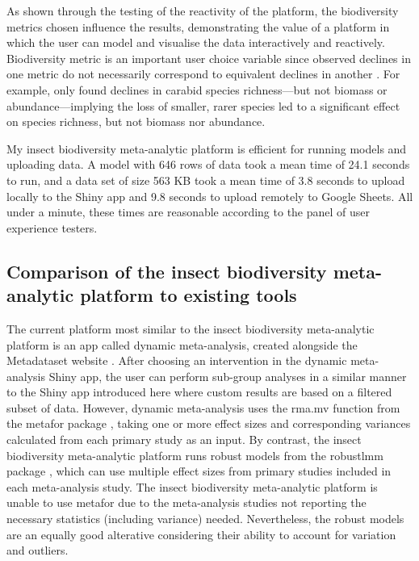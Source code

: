 \documentclass[11pt]{article}
\begin{document}
		\noindent As shown through the testing of the reactivity of the platform, the biodiversity metrics chosen influence the results, demonstrating the value of a platform in which the user can model and visualise the data interactively and reactively. Biodiversity metric is an important user choice variable since observed declines in one metric do not necessarily correspond to equivalent declines in another \parencite{hillebrand2018biodiversity}. For example, \textcite{homburg2019have} only found declines in carabid species richness—but not biomass or abundance—implying the loss of smaller, rarer species led to a significant effect on species richness, but not biomass nor abundance. 
		
		\noindent My insect biodiversity meta-analytic platform is efficient for running models and uploading data. A model with 646 rows of data took a mean time of 24.1 seconds to run, and a data set of size 563 KB took a mean time of 3.8 seconds to upload locally to the Shiny app and 9.8 seconds to upload remotely to Google Sheets. All under a minute, these times are reasonable according to the panel of user experience testers.
		
		\subsection{Comparison of the insect biodiversity meta-analytic platform to existing tools}
			The current platform most similar to the insect biodiversity meta-analytic platform is an app called dynamic meta-analysis, created alongside the Metadataset website \parencite{shackelford2021dynamic}. After choosing an intervention in the dynamic meta-analysis Shiny app, the user can perform sub-group analyses in a similar manner to the Shiny app introduced here where custom results are based on a filtered subset of data. However, dynamic meta-analysis uses the rma.mv function from the metafor package \parencite{viechtbauer2010conducting}, taking one or more effect sizes and corresponding variances calculated from each primary study as an input. By contrast, the insect biodiversity meta-analytic platform runs robust models from the robustlmm package \parencite{koller2016robustlmm}, which can use multiple effect sizes from primary studies included in each meta-analysis study. The insect biodiversity meta-analytic platform is unable to use metafor due to the meta-analysis studies not reporting the necessary statistics (including variance) needed. Nevertheless, the robust models are an equally good alterative considering their ability to account for variation and outliers. 
			
\end{document}
